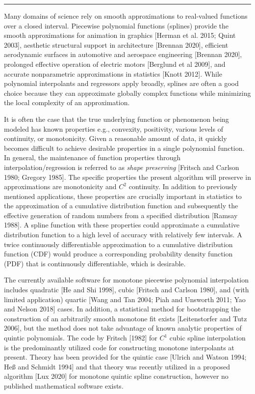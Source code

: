 \bigskip\hrule\bigskip\medskip
{}

Many domains of science rely on smooth approximations to real-valued
functions over a closed interval. Piecewise polynomial functions
(splines) provide the smooth approximations for animation in graphics
[Herman et al. 2015; Quint 2003], aesthetic structural support in
architecture [Brennan 2020], efficient aerodynamic surfaces in
automotive and aerospace engineering [Brennan 2020], prolonged
effective operation of electric motors [Berglund et al 2009], and
accurate nonparametric approximations in statistics [Knott
  2012]. While polynomial interpolants and regressors apply broadly,
splines are often a good choice because they can approximate globally
complex functions while minimizing the local complexity of an
approximation.

It is often the case that the true underlying function or phenomenon
being modeled has known properties e.g., convexity, positivity,
various levels of continuity, or monotonicity. Given a reasonable
amount of data, it quickly becomes difficult to achieve desirable
properties in a single polynomial function. In general, the
maintenance of function properties through interpolation/regression is
referred to as {\it shape preserving} [Fritsch and Carlson 1980;
  Gregory 1985]. The specific properties the present algorithm will
preserve in approximations are monotonicity and $C^2$ continuity. In
addition to previously mentioned applications, these properties are
crucially important in statistics to the approximation of a cumulative
distribution function and subsequently the effective generation of
random numbers from a specified distribution [Ramsay 1988].  A spline
function with these properties could approximate a cumulative
distribution function to a high level of accuracy with relatively few
intervals. A twice continuously differentiable approximation to a
cumulative distribution function (CDF) would produce a corresponding
probability density function (PDF) that is continuously
differentiable, which is desirable.

The currently available software for monotone piecewise polynomial
interpolation includes quadratic [He and Shi 1998], cubic [Fritsch and
  Carlson 1980], and (with limited application) quartic [Wang and Tan
  2004; Piah and Unsworth 2011; Yao and Nelson 2018] cases. In
addition, a statistical method for bootstrapping the construction of
an arbitrarily smooth monotone fit exists [Leitenstorfer and Tutz
  2006], but the method does not take advantage of known analytic
properties of quintic polynomials. The code by Fritsch [1982] for
$C^1$ cubic spline interpolation is the predominantly utilized code
for constructing monotone interpolants at present. Theory has been
provided for the quintic case [Ulrich and Watson 1994; He{\ss} and
  Schmidt 1994] and that theory was recently utilized in a proposed
algorithm [Lux 2020] for monotone quintic spline construction, however
no published mathematical software exists.

